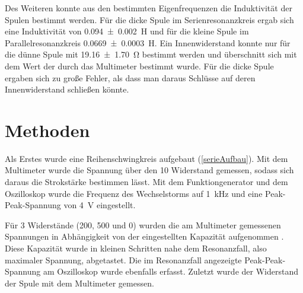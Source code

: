 \documentclass[
	a4paper,
	12pt,
	pagesize,
	ngerman
]{scrartcl}
\begin{document}
	Des Weiteren konnte aus den bestimmten Eigenfrequenzen die Induktivität der Spulen bestimmt werden.
	Für die dicke Spule im Serienresonanzkreis ergab sich eine Induktivität von \SI{0,094 \pm 0,002}{H} und für die kleine Spule im Parallelresonanzkreis \SI{0,0669 \pm 0,0003}{H}.
	Ein Innenwiderstand konnte nur für die dünne Spule mit \SI{19.16\pm1,70}{\ohm} bestimmt werden und überschnitt sich mit dem Wert der durch das Multimeter bestimmt wurde.
	Für die dicke Spule ergaben sich zu große Fehler, als dass man daraus Schlüsse auf deren Innenwiderstand schließen könnte.



	\section{Methoden}
	Als Erstes wurde eine Reihenschwingkreis aufgebaut (\cref{serieAufbau}).
	Mit dem Multimeter wurde die Spannung über den \SI{10}{\Omega} Widerstand gemessen, sodass sich daraus die Strokstärke bestimmen lässt.
	Mit dem Funktiongenerator und dem Oszilloskop wurde die Frequenz des Wechselstorms auf \SI{1}{kHz} und eine Peak-Peak-Spannung von \SI{4}{V} eingestellt.

	Für 3 Widerstände (\SI{200}{\Omega}, \SI{500}{\Omega} und \SI{0}{\Omega}) wurden die am Multimeter gemessenen Spannungen in Abhängigkeit von der eingestellten Kapazität aufgenommen .
	Diese Kapazität wurde in kleinen Schritten nahe dem Resonanzfall, also maximaler Spannung, abgetastet.
	Die im Resonanzfall angezeigte Peak-Peak-Spannung am Oszilloskop wurde ebenfalls erfasst.
	Zuletzt wurde der Widerstand der Spule mit dem Multimeter gemessen.
\end{document}
